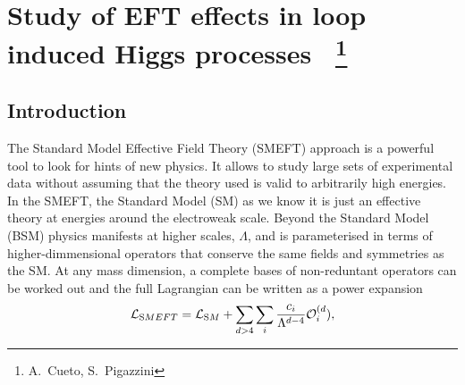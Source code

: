 \newcommand{\Herwig}{H\protect\scalebox{0.8}{ERWIG}\xspace}
\newcommand{\Pythia}{P\protect\scalebox{0.8}{YTHIA}\xspace}
\newcommand{\Sherpa}{S\protect\scalebox{0.8}{HERPA}\xspace}
\newcommand{\Rivet}{R\protect\scalebox{0.8}{IVET}\xspace}
\newcommand{\Professor}{P\protect\scalebox{0.8}{ROFESSOR}\xspace}
\newcommand{\eps}{\varepsilon}
\newcommand{\mc}[1]{\mathcal{#1}}
\newcommand{\mr}[1]{\mathrm{#1}}
\newcommand{\mb}[1]{\mathbb{#1}}
\newcommand{\tm}[1]{\scalebox{0.95}{$#1$}}
\newcommand{\SMEFTsim}{\texttt{SMEFTsim}}
\newcommand{\SMEFTatNLO}{\texttt{SMEFT@NLO}}
\newcommand{\Madgraph}{M\protect\scalebox{0.8}{ADGRAPH}\xspace}
\section{Study of EFT effects in loop induced Higgs processes ~\protect\footnote{
  A.~Cueto,
  S.~Pigazzini}{}}

\label{sec:projname}



\subsection{Introduction}
\label{sec:higgseft:section1}
The Standard Model Effective Field Theory (SMEFT) approach is a powerful tool to look for hints of new physics. It allows to study large sets of experimental data without assuming that the theory used is valid to arbitrarily high energies. In the SMEFT, the Standard Model (SM) as we know it is just an effective theory at energies around the electroweak scale. Beyond the Standard Model (BSM) physics manifests at higher scales, $\Lambda$, and is parameterised in terms of higher-dimmensional operators that conserve the same fields and symmetries as the SM. At any mass dimension, a complete bases of non-reduntant operators can be worked out and the full Lagrangian can be written as a power expansion
\begin{equation}
\mathcal{L}_{\textrm SMEFT} = \mathcal{L}_{\textrm SM} + \sum_{d>4}\sum_{i}\frac{c_i}{\Lambda^{d-4}}\mathcal{O}_{i}^{(d}),
\end{equation}  

